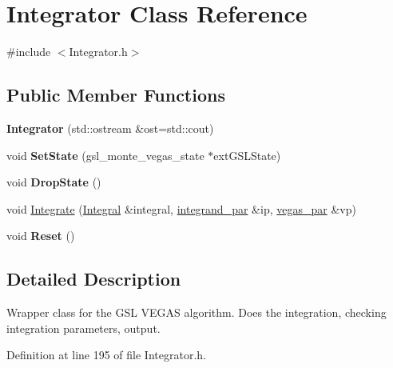 \hypertarget{classIntegrator}{\section{Integrator Class Reference}
\label{classIntegrator}
}


{\ttfamily \#include $<$Integrator.\-h$>$}

\subsection*{Public Member Functions}
\begin{DoxyCompactItemize}
\item 
\hypertarget{classIntegrator_a410d73f69871a01a49401a6705325a46}{{\bfseries Integrator} (std\-::ostream \&ost=std\-::cout)}\label{classIntegrator_a410d73f69871a01a49401a6705325a46}

\item 
\hypertarget{classIntegrator_aa4e70784278ed8a0e07bb59a153a4098}{void {\bfseries Set\-State} (gsl\-\_\-monte\-\_\-vegas\-\_\-state $\ast$ext\-G\-S\-L\-State)}\label{classIntegrator_aa4e70784278ed8a0e07bb59a153a4098}

\item 
\hypertarget{classIntegrator_a7abd0680a883e614c1e6344c8fda5360}{void {\bfseries Drop\-State} ()}\label{classIntegrator_a7abd0680a883e614c1e6344c8fda5360}

\item 
void \hyperlink{classIntegrator_a999142aeac7e98ab084eaad2c257a233}{Integrate} (\hyperlink{classIntegral}{Integral} \&integral, \hyperlink{classintegrand__par}{integrand\-\_\-par} \&ip, \hyperlink{classvegas__par}{vegas\-\_\-par} \&vp)
\item 
\hypertarget{classIntegrator_ac9ea33447f83278d1bd1dd37ac70e30e}{void {\bfseries Reset} ()}\label{classIntegrator_ac9ea33447f83278d1bd1dd37ac70e30e}

\end{DoxyCompactItemize}


\subsection{Detailed Description}
Wrapper class for the G\-S\-L V\-E\-G\-A\-S algorithm. Does the integration, checking integration parameters, output. 

Definition at line 195 of file Integrator.\-h.



